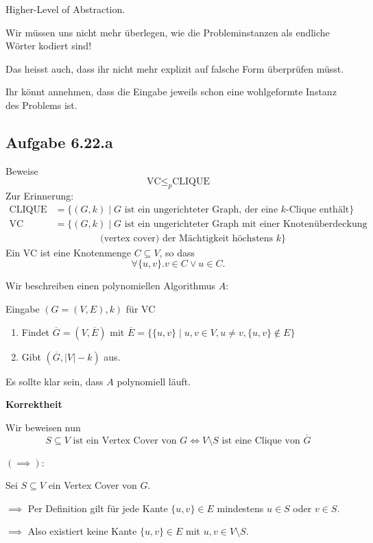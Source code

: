 \documentclass[a4paper, 11pt]{article}
\begin{document}
	Higher-Level of Abstraction. 

	Wir müssen uns nicht mehr überlegen, wie die Probleminstanzen als endliche Wörter kodiert sind!

	
	Das heisst auch, dass ihr nicht mehr explizit auf falsche Form überprüfen müsst.

	Ihr könnt annehmen, dass die Eingabe jeweils schon eine wohlgeformte Instanz des Problems ist.


\subsection{Aufgabe 6.22.a}
	Beweise 
	$$\text{VC} \leq_p \text{CLIQUE}$$
	Zur Erinnerung:
	\begin{align*}
		\text{CLIQUE} &= \{(G, k) \mid G \text{ ist ein ungerichteter Graph, der eine $k$-Clique enthält}\}\\
		\text{VC} &= \{(G, k) \mid G \text{ ist ein ungerichteter Graph mit einer Knotenüberdeckung}\\ 
		 & \hspace{2cm}\text{(vertex cover) der Mächtigkeit höchstens }k\}
	\end{align*}
	Ein VC ist eine Knotenmenge $C \subseteq V$, so dass 
	$$\forall \{u, v\}. v \in C \lor u \in C.$$

	Wir beschreiben einen polynomiellen Algorithmus $A$:

	Eingabe $(G = (V, E), k)$ für VC
	\begin{enumerate}[label=\arabic*.]
		\item Findet $\overline{G} = (V, \overline{E})$ mit $\overline{E} = \{\{u, v\} \mid u, v \in V, u \neq v, \{u, v\} \notin E\}$
		\item Gibt $(\overline{G}, |V| - k)$ aus.
	\end{enumerate}
	Es sollte klar sein, dass $A$ polynomiell läuft.

	\textbf{Korrektheit}

	Wir beweisen nun 
	$$S \subseteq V \text{ ist ein Vertex Cover von }G \iff V\setminus S \text{ ist eine Clique von } \overline{G}$$

	$\mathbf{(\implies):}$

	Sei $S \subseteq V$ ein Vertex Cover von $G$. 
	
	
	$\implies$ Per Definition gilt für jede Kante $\{u, v\} \in E$ mindestens $u \in S$ oder $v \in S$.
		
	
	$\implies$ Also existiert keine Kante $\{u, v\} \in E$ mit $u, v \in V\setminus S$.
\end{document}
